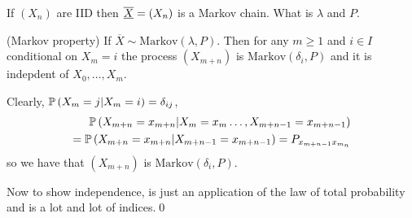 \documentclass{article}
\begin{document}
\par
If $ (X_n) $ are IID then $ \underline{\overline{X}}=(X_n) $ is a Markov chain. What is $ \lambda $ and $ P $.
\begin{theorem}
	(Markov property) If $ \overline X \sim \text{Markov}(\lambda, P) $. Then for any $ m\ge 1 $ and $ i\in I $ conditional on $ X_m=i $ the process $ (X_{m+n}) $ is $ \text{Markov}(\delta_i,P) $ and it is indepdent of $ X_0,\dots, X_m $.
\end{theorem}
\pf Clearly, $ \mathbb{P}\left({X_m=j|X_m=i}\right)=\delta_{ij} $,
\begin{align*}
	\mathbb{P}\left({X_{m+n}=x_{m+n} | X_m=x_m\dots, X_{m+n-1}=x_{m+n-1}}\right) \\
	=\mathbb{P}\left({X_{m+n}=x_{m+n} | X_{m+n-1}=x_{m+n-1}}\right)=P_{x_{m+n-1}x_{m_n}}
\end{align*}
so we have that $ (X_{m+n}) $ is $ \text{Markov}(\delta_i, P) $.\par
Now to show independence, is just an application of the law of total probability and is a lot and lot of indices.\qed
\end{document}
